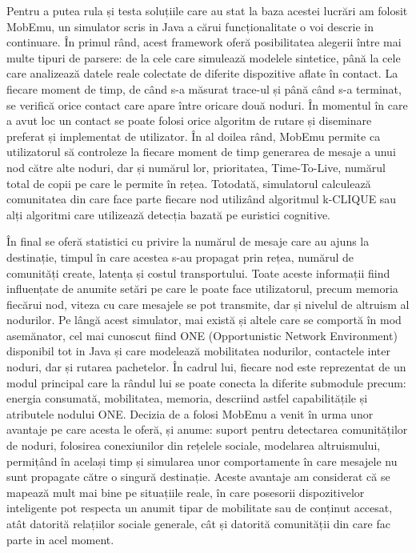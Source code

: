 \documentclass[12pt,a4paper]{report}
\begin{document}
Pentru a putea rula și testa soluțiile care au stat la baza acestei lucrări am folosit MobEmu, un simulator scris in Java a cărui funcționalitate o voi descrie in continuare. În primul rând, acest framework oferă posibilitatea alegerii între mai multe tipuri de parsere: de la cele care simulează modelele sintetice, până la cele care analizează datele reale colectate de diferite dispozitive aflate în contact. La fiecare moment de timp, de când s-a măsurat trace-ul și până când s-a terminat, se verifică orice contact care apare între oricare două noduri. În momentul în care a avut loc un contact se poate folosi orice algoritm de rutare și diseminare preferat și implementat de utilizator. 
În al doilea rând, MobEmu permite ca utilizatorul să controleze la fiecare moment de timp generarea de mesaje a unui nod către alte noduri, dar și numărul lor, prioritatea, Time-To-Live, numărul total de copii pe care le permite în rețea. Totodată, simulatorul calculează comunitatea din care face parte fiecare nod utilizând algoritmul k-CLIQUE sau alți algoritmi care utilizează detecția bazată pe euristici cognitive. 

În final se oferă statistici cu privire la numărul de mesaje care au ajuns la destinație, timpul în care acestea s-au propagat prin rețea, numărul de comunități create, latența și costul transportului. Toate aceste informații fiind influențate de anumite setări pe care le poate face utilizatorul, precum memoria fiecărui nod, viteza cu care mesajele se pot transmite, dar și nivelul de altruism al nodurilor.
Pe lângă acest simulator, mai există și altele care se comportă în mod asemănator, cel mai cunoscut fiind ONE (Opportunistic Network Environment)~\cite{OneArticle} disponibil tot in Java și care modelează mobilitatea nodurilor, contactele inter noduri, dar și rutarea pachetelor. În cadrul lui, fiecare nod este reprezentat de un modul principal care la rândul lui se poate conecta la diferite submodule precum: energia consumată, mobilitatea, memoria, descriind astfel capabilitățile și atributele nodului ONE. Decizia de a folosi MobEmu a venit în urma unor avantaje pe care acesta le oferă, și anume: suport pentru detectarea comunităților de noduri, folosirea conexiunilor din rețelele sociale, modelarea altruismului, permițând în același timp și simularea unor comportamente în care mesajele nu sunt propagate către o singură destinație. Aceste avantaje am considerat că se mapează mult mai bine pe situațiile reale, în care posesorii dispozitivelor inteligente pot respecta un anumit tipar de mobilitate sau de conținut accesat, atât datorită relațiilor sociale generale, cât și datorită comunității din care fac parte in acel moment.  
\fi
\end{document}
